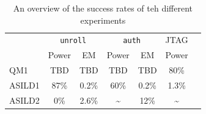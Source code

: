 \documentclass[a4paper, 10pt]{article}
\newcommand{\TI}{ASILD1\xspace}
\newcommand{\ST}{ASILD2\xspace}
\newcommand{\NXP}{QM1\xspace}
\newcommand{\unroll}{\texttt{unroll}\xspace}
\newcommand{\auth}{\texttt{auth}\xspace}
\newcommand{\jtag}{JTAG\xspace}
\begin{document}
\begin{table}[tb]
\centering
\begin{tabular}{@{}l cc cc cc @{}}
\toprule
         & \multicolumn{2}{c}{\unroll}  
         & \multicolumn{2}{c}{\auth}        
         & \multicolumn{1}{c}{\jtag}       \\
           
           \cmidrule(lr){2-3}  \cmidrule(lr){4-5}  \cmidrule(l){6-6}      
         
         & \multicolumn{1}{c}{Power}                        & \multicolumn{1}{c}{EM}  
         & \multicolumn{1}{c}{Power}                        & \multicolumn{1}{c}{EM}                              
         & \multicolumn{1}{c}{Power}       \\
           
        

        \midrule
\NXP      
         & \cellcolor{gray!0}TBD       %
         & \cellcolor{gray!0}TBD       %
         & \cellcolor{gray!0}TBD       %
         & \cellcolor{gray!0}TBD       %
         & \cellcolor{red!0}80\%       %
         \\
\TI      & \cellcolor{red!0}87\%       %
         & \cellcolor{red!0}0.2\%      %
         & \cellcolor{red!0}60\%       %
         & \cellcolor{red!0}0.2\%      %
         & \cellcolor{yellow!0}1.3\%  %
         \\
\ST 
         & \cellcolor{green!0}0\% %
         & \cellcolor{red!0}2.6\%      %
         & \cellcolor{gray!0}\textasciitilde          %
         & \cellcolor{red!0}12\%       %
         & \cellcolor{gray!0}\textasciitilde          %
         \\
\bottomrule
\end{tabular}
\caption{An overview of the success rates of teh different experiments} 
\label{tab:experiments}
\end{table}
\end{document}

